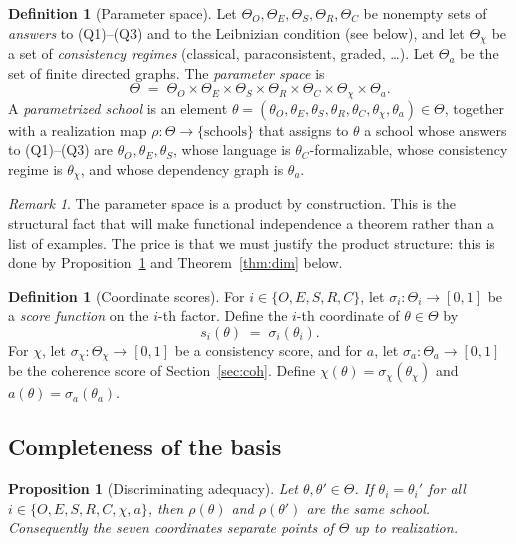 \documentclass[11pt]{article}
\newtheorem{proposition}[theorem]{Proposition}
\theoremstyle{definition}
\newtheorem{definition}[theorem]{Definition}
\theoremstyle{remark}
\newtheorem{remark}[theorem]{Remark}
\newcommand{\Th}{\Theta}
\begin{document}
\begin{definition}[Parameter space]\label{def:param}
Let $\Th_O,\Th_E,\Th_S,\Th_R,\Th_C$ be nonempty sets of \emph{answers} to (Q1)--(Q3) and to the Leibnizian condition (see below), and let $\Th_\chi$ be a set of \emph{consistency regimes} (classical, paraconsistent, graded, \dots). Let $\Th_a$ be the set of finite directed graphs. The \emph{parameter space} is
\[
\Th \;=\; \Th_O\times\Th_E\times\Th_S\times\Th_R\times\Th_C\times\Th_\chi\times\Th_a .
\]
A \emph{parametrized school} is an element $\theta=(\theta_O,\theta_E,\theta_S,\theta_R,\theta_C,\theta_\chi,\theta_a)\in\Th$, together with a realization map $\rho:\Th\to\{\text{schools}\}$ that assigns to $\theta$ a school whose answers to (Q1)--(Q3) are $\theta_O,\theta_E,\theta_S$, whose language is $\theta_C$-formalizable, whose consistency regime is $\theta_\chi$, and whose dependency graph is $\theta_a$.
\end{definition}

\begin{remark}
The parameter space is a product by construction. This is the structural fact that will make functional independence a theorem rather than a list of examples. The price is that we must justify the product structure: this is done by Proposition~\ref{prop:complete} and Theorem~\ref{thm:dim} below.
\end{remark}

\begin{definition}[Coordinate scores]\label{def:scores}
For $i\in\{O,E,S,R,C\}$, let $\sigma_i:\Th_i\to[0,1]$ be a \emph{score function} on the $i$-th factor. Define the $i$-th coordinate of $\theta\in\Th$ by
\[
s_i(\theta) \;=\; \sigma_i(\theta_i).
\]
For $\chi$, let $\sigma_\chi:\Th_\chi\to[0,1]$ be a consistency score, and for $a$, let $\sigma_a:\Th_a\to[0,1]$ be the coherence score of Section~\ref{sec:coh}. Define $\chi(\theta)=\sigma_\chi(\theta_\chi)$ and $a(\theta)=\sigma_a(\theta_a)$.
\end{definition}

\subsection{Completeness of the basis}

\begin{proposition}[Discriminating adequacy]\label{prop:complete}
Let $\theta,\theta'\in\Th$. If $\theta_i=\theta_i'$ for all $i\in\{O,E,S,R,C,\chi,a\}$, then $\rho(\theta)$ and $\rho(\theta')$ are the same school. Consequently the seven coordinates separate points of $\Th$ up to realization.
\end{proposition}
\end{document}
